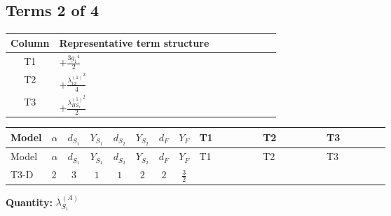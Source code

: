\documentclass[8pt]{article}
\begin{document}
\begin{landscape}
\subsection*{Terms 2 of 4}
\begin{center}
\begin{tabular}{@{}c >{\raggedright\arraybackslash}p{0.82\linewidth}@{}}
\toprule
Column & Representative term structure \\
\midrule
T1 & \(\displaystyle +\frac{3 {g_1}^4}{2}\) \\
\midrule
T2 & \(\displaystyle +\frac{{\lambda_{12}^{(1)}}^2}{4}\) \\
\midrule
T3 & \(\displaystyle +\frac{{\lambda_{HS_1}^{(1)}}^2}{2}\) \\
\midrule
\bottomrule
\end{tabular}
\end{center}
\smallskip
\tiny
\begin{longtable}{@{}llcccccc >{\raggedright\arraybackslash}p{0.21\linewidth} >{\raggedright\arraybackslash}p{0.21\linewidth} >{\raggedright\arraybackslash}p{0.21\linewidth}@{}}
\toprule
Model & $\alpha$ & $d_{S_1}$ & $Y_{S_1}$ & $d_{S_2}$ & $Y_{S_2}$ & $d_F$ & $Y_F$ & T1 & T2 & T3 \\
\midrule
\endfirsthead
\toprule
Model & $\alpha$ & $d_{S_1}$ & $Y_{S_1}$ & $d_{S_2}$ & $Y_{S_2}$ & $d_F$ & $Y_F$ & T1 & T2 & T3 \\
\midrule
\endhead
T3-D & $2$ & $3$ & $1$ & $1$ & $2$ & $2$ & $\frac{3}{2}$ & \scriptsize\adjustbox{max width=\linewidth}{$\begin{gathered} +\frac{3 {g_1}^4}{2}\end{gathered}$} & \scriptsize\adjustbox{max width=\linewidth}{$\begin{gathered} +\frac{{\lambda_{12}^{(1)}}^2}{4}\end{gathered}$} & \scriptsize\adjustbox{max width=\linewidth}{$\begin{gathered} +\frac{{\lambda_{HS_1}^{(1)}}^2}{2}\end{gathered}$} \\
\midrule
\bottomrule
\end{longtable}
\clearpage
\noindent\textbf{Quantity: }$\lambda_{S_1}^{(A)}$\par\smallskip

\end{landscape}
\end{document}
